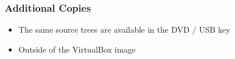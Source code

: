 
\begin{frame}
\frametitle{Additional Copies}
\begin{itemize}
\item The same source trees are available in the DVD / USB key
\item Outside of the VirtualBox image
\end{itemize}
\end{frame}

